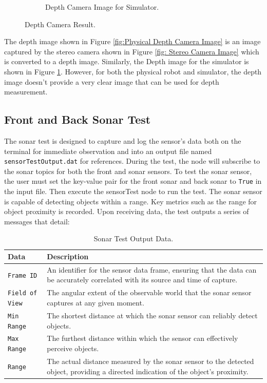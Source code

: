 \documentclass{CSSRforAfrica}
\begin{document}
\begin{figure}[!hbpt]
\begin{subfigure}[b]{0.45\linewidth}
          \caption{Depth Camera Image for Simulator.}
          \label{fig:Simulator Depth Camera Image}
        \end{subfigure}
    \caption{Depth Camera Result.}
    \label{fig:depth_camera_results} %
\end{figure}

The depth image shown in Figure \ref{fig:Physical Depth Camera Image} is an image captured by the stereo camera shown in Figure \ref{fig: Stereo Camera Image} which 
is converted to a depth image. Similarly, the Depth image for the simulator is shown in Figure \ref{fig:Simulator Depth Camera Image}.
However, for both the physical robot and simulator, the depth image doesn't provide a very clear image that can be used for
depth measurement.

\newpage

\subsection{Front and Back Sonar Test}
The sonar test is designed to capture and log the sensor's data both on the terminal for 
immediate observation and into an output file named \texttt{sensorTestOutput.dat} for references. 
During the test, the node will subscribe to the sonar topics for both the front and sonar sensors. 
To test the sonar sensor, the user must set the key-value pair for the front sonar and back sonar to \texttt{True} in the input file. 
Then execute the sensorTest node to run the test. The sonar sensor is capable of detecting objects within a range. Key metrics such 
as the range for object proximity is recorded. Upon receiving data, the test outputs a series 
of messages that detail:
\begin{longtable}[c]{|l|p{12cm}|}
	\caption{Sonar Test Output Data.} \label{tab:sonar_test_output}\\
	\hline
	\rowcolor{gray!30}
	\textbf{Data} & \textbf{Description} \\ \hline
	\endhead %
	\small{\texttt{Frame ID}} & \small{An identifier for the sensor data frame, ensuring that the data can be accurately correlated with its source and time of capture.} \\ \hline
	\small{\texttt{Field of View}} & \small{The angular extent of the observable world that the sonar sensor captures at any given moment.} \\ \hline
	\small{\texttt{Min Range}} & \small{The shortest distance at which the sonar sensor can reliably detect objects.} \\ \hline
	\small{\texttt{Max Range}} & \small{The furthest distance within which the sensor can effectively perceive objects.} \\ \hline
	\small{\texttt{Range}} & \small{The actual distance measured by the sonar sensor to the detected object, providing a directed indication of the object's proximity.} \\ \hline
\end{longtable}
\end{document}
